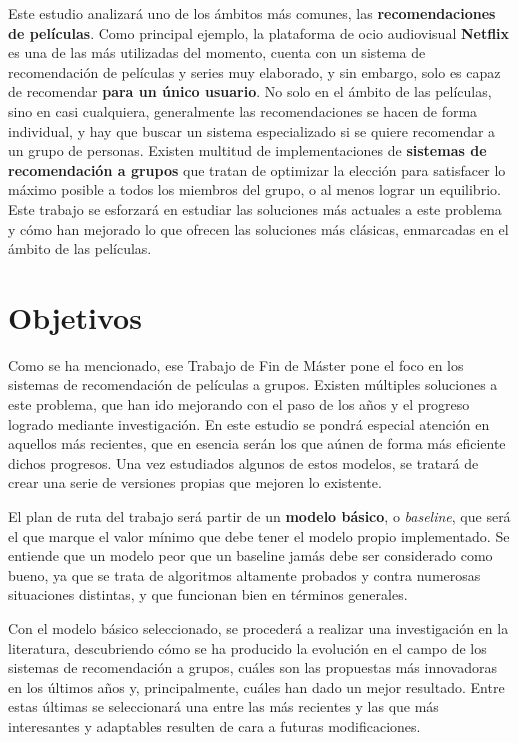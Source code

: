 Este estudio analizará uno de los ámbitos más comunes, las \textbf{recomendaciones de películas}. Como principal ejemplo, la plataforma de ocio audiovisual \textbf{Netflix} es una de las más utilizadas del momento, cuenta con un sistema de recomendación de películas y series muy elaborado, y sin embargo, solo es capaz de recomendar \textbf{para un único usuario}. No solo en el ámbito de las películas, sino en casi cualquiera, generalmente las recomendaciones se hacen de forma individual, y hay que buscar un sistema especializado si se quiere recomendar a un grupo de personas. Existen multitud de implementaciones de \textbf{sistemas de recomendación a grupos} que tratan de optimizar la elección para satisfacer lo máximo posible a todos los miembros del grupo, o al menos lograr un equilibrio. Este trabajo se esforzará en estudiar las soluciones más actuales a este problema y cómo han mejorado lo que ofrecen las soluciones más clásicas, enmarcadas en el ámbito de las películas.

\section{Objetivos}

Como se ha mencionado, ese Trabajo de Fin de Máster pone el foco en los sistemas de recomendación de películas a grupos. Existen múltiples soluciones a este problema, que han ido mejorando con el paso de los años y el progreso logrado mediante investigación. En este estudio se pondrá especial atención en aquellos más recientes, que en esencia serán los que aúnen de forma más eficiente dichos progresos. Una vez estudiados algunos de estos modelos, se tratará de crear una serie de versiones propias que mejoren lo existente.

El plan de ruta del trabajo será partir de un \textbf{modelo básico}, o \textit{baseline}, que será el que marque el valor mínimo que debe tener el modelo propio implementado. Se entiende que un modelo peor que un baseline jamás debe ser considerado como bueno, ya que se trata de algoritmos altamente probados y contra numerosas situaciones distintas, y que funcionan bien en términos generales.

Con el modelo básico seleccionado, se procederá a realizar una investigación en la literatura, descubriendo cómo se ha producido la evolución en el campo de los sistemas de recomendación a grupos, cuáles son las propuestas más innovadoras en los últimos años y, principalmente, cuáles han dado un mejor resultado. Entre estas últimas se seleccionará una entre las más recientes y las que más interesantes y adaptables resulten de cara a futuras modificaciones.

